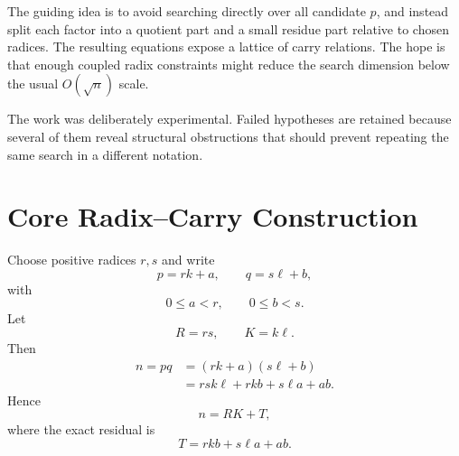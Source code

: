 \documentclass[11pt,a4paper]{article}
\begin{document}
The guiding idea is to avoid searching directly over all candidate \(p\), and instead split each factor into a quotient part and a small residue part relative to chosen radices. The resulting equations expose a lattice of carry relations. The hope is that enough coupled radix constraints might reduce the search dimension below the usual \(O(\sqrt n)\) scale.

The work was deliberately experimental. Failed hypotheses are retained because several of them reveal structural obstructions that should prevent repeating the same search in a different notation.

\section{Core Radix--Carry Construction}
Choose positive radices \(r,s\) and write
\begin{equation}
    p=rk+a, \qquad q=s\ell+b,
\end{equation}
with
\begin{equation}
    0\le a<r, \qquad 0\le b<s.
\end{equation}
Let
\begin{equation}
    R=rs, \qquad K=k\ell.
\end{equation}
Then
\begin{align}
    n=pq
      &= (rk+a)(s\ell+b)\\
      &= rs k\ell + rk b + s\ell a + ab.
\end{align}
Hence
\begin{equation}
    n = RK + T,
\end{equation}
where the exact residual is
\begin{equation}
    T=rkb+s\ell a+ab.
\end{equation}
\end{document}
